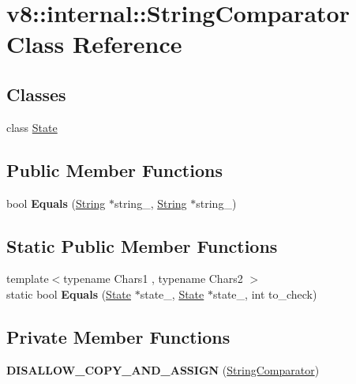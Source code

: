 \hypertarget{classv8_1_1internal_1_1_string_comparator}{}\section{v8\+:\+:internal\+:\+:String\+Comparator Class Reference}
\label{classv8_1_1internal_1_1_string_comparator}
\subsection*{Classes}
\begin{DoxyCompactItemize}
\item 
class \hyperlink{classv8_1_1internal_1_1_string_comparator_1_1_state}{State}
\end{DoxyCompactItemize}
\subsection*{Public Member Functions}
\begin{DoxyCompactItemize}
\item 
bool {\bfseries Equals} (\hyperlink{classv8_1_1internal_1_1_string}{String} $\ast$string\+\_, \hyperlink{classv8_1_1internal_1_1_string}{String} $\ast$string\+\_)\hypertarget{classv8_1_1internal_1_1_string_comparator_ad8ae1c583ecb97c39c86a7581ad1dbab}{}\label{classv8_1_1internal_1_1_string_comparator_ad8ae1c583ecb97c39c86a7581ad1dbab}

\end{DoxyCompactItemize}
\subsection*{Static Public Member Functions}
\begin{DoxyCompactItemize}
\item 
{\footnotesize template$<$typename Chars1 , typename Chars2 $>$ }\\static bool {\bfseries Equals} (\hyperlink{classv8_1_1internal_1_1_string_comparator_1_1_state}{State} $\ast$state\+\_, \hyperlink{classv8_1_1internal_1_1_string_comparator_1_1_state}{State} $\ast$state\+\_, int to\+\_\+check)\hypertarget{classv8_1_1internal_1_1_string_comparator_a461c33dfaa39d470b8f1efcde929c6c3}{}\label{classv8_1_1internal_1_1_string_comparator_a461c33dfaa39d470b8f1efcde929c6c3}

\end{DoxyCompactItemize}
\subsection*{Private Member Functions}
\begin{DoxyCompactItemize}
\item 
{\bfseries D\+I\+S\+A\+L\+L\+O\+W\+\_\+\+C\+O\+P\+Y\+\_\+\+A\+N\+D\+\_\+\+A\+S\+S\+I\+GN} (\hyperlink{classv8_1_1internal_1_1_string_comparator}{String\+Comparator})\hypertarget{classv8_1_1internal_1_1_string_comparator_aaaddba890193264448afd3ee4025480c}{}\label{classv8_1_1internal_1_1_string_comparator_aaaddba890193264448afd3ee4025480c}

\end{DoxyCompactItemize}
